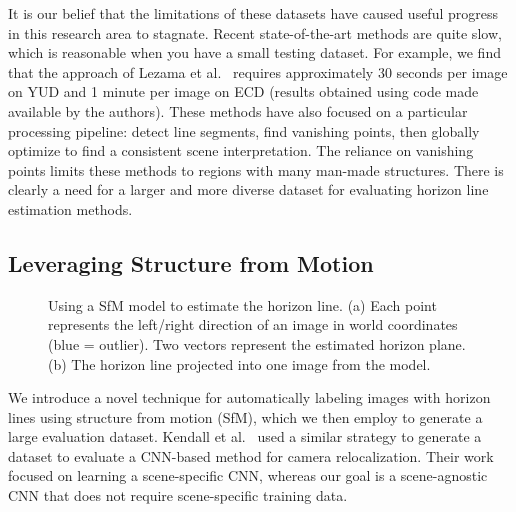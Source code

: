 \documentclass{bmvc2k}
\begin{document}
It is our belief that the limitations of these datasets have caused
useful progress in this research area to stagnate. Recent 
state-of-the-art methods are quite slow, which is reasonable when you
have a small testing dataset.  For example, we find that the
approach of Lezama et al.~\cite{lezama2014finding} requires
approximately 30 seconds per image on YUD and 1 minute per image on
ECD (results obtained using code made available by the authors). These
methods have also focused on a particular processing pipeline: detect
line segments, find vanishing points, then globally optimize to find a
consistent scene interpretation. The reliance on vanishing points
limits these methods to regions with many man-made structures. There
is clearly a need for a larger and more diverse dataset for evaluating
horizon line estimation methods.

\subsection{Leveraging Structure from Motion}
\label{sec:sfm}

\begin{figure}
 
  \centering
 

  \caption{Using a SfM model to estimate the horizon line. (a) Each
  point represents the left/right direction of an image in world
  coordinates (blue = outlier). Two vectors represent the estimated
  horizon plane. (b) The horizon line projected into one image from
  the model.}
  
  \label{fig:sfm}
\end{figure}

We introduce a novel technique for automatically
labeling images with horizon lines using structure from motion (SfM),
which we then employ to generate a large evaluation dataset. Kendall
et al.~\cite{kendall2015convolutional} used a similar strategy to
generate a dataset to evaluate a CNN-based method for camera
relocalization. Their work focused on learning a scene-specific CNN,
whereas our goal is a scene-agnostic CNN that does not require
scene-specific training data.
\end{document}
